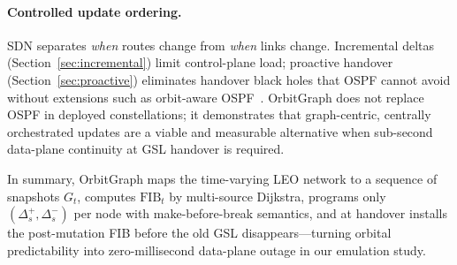 \paragraph{Controlled update ordering.}
SDN separates \emph{when} routes change from \emph{when} links change.
Incremental deltas (Section~\ref{sec:incremental}) limit control-plane load;
proactive handover (Section~\ref{sec:proactive}) eliminates handover black
holes that OSPF cannot avoid without extensions such as orbit-aware
OSPF~\cite{pam:opspf:2019}.
OrbitGraph does not replace OSPF in deployed constellations; it demonstrates
that graph-centric, centrally orchestrated updates are a viable and measurable
alternative when sub-second data-plane continuity at GSL handover is required.

In summary, OrbitGraph maps the time-varying LEO network to a sequence of
snapshots $G_t$, computes $\mathrm{FIB}_t$ by multi-source Dijkstra,
programs only $(\Delta_s^{+}, \Delta_s^{-})$ per node with make-before-break
semantics, and at handover installs the post-mutation FIB before the old GSL
disappears---turning orbital predictability into zero-millisecond data-plane
outage in our emulation study.
